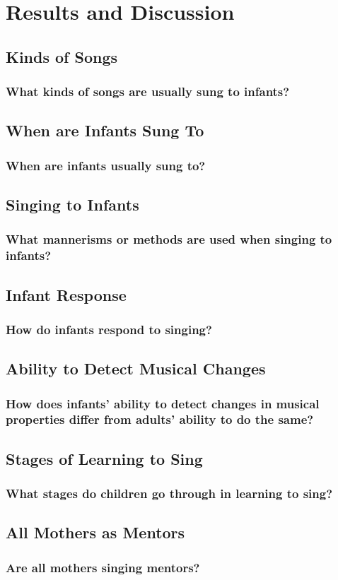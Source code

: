 \documentclass{beamer}
\begin{document}
\section{Results and Discussion}
\subsection*{Kinds of Songs}
\begin{frame}
	\frametitle{What kinds of songs are usually sung to infants?}
\end{frame}

\subsection*{When are Infants Sung To}
\begin{frame}
	\frametitle{When are infants usually sung to?}
\end{frame}

\subsection*{Singing to Infants}
\begin{frame}
	\frametitle{What mannerisms or methods are used when singing to infants?}
\end{frame}

\subsection*{Infant Response}
\begin{frame}
	\frametitle{How do infants respond to singing?}
\end{frame}

\subsection*{Ability to Detect Musical Changes}
\begin{frame}
	\frametitle{How does infants' ability to detect changes in musical properties differ from adults' ability to do the same?}
\end{frame}

\subsection*{Stages of Learning to Sing}
\begin{frame}
	\frametitle{What stages do children go through in learning to sing?}
\end{frame}

\subsection*{All Mothers as Mentors}
\begin{frame}
	\frametitle{Are all mothers singing mentors?}
\end{frame}

\end{document}
